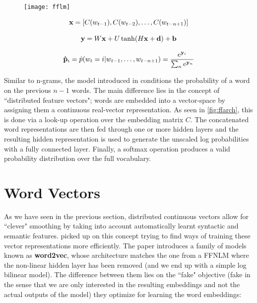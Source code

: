 \begin{figure}[H]
	\noindent\begin{minipage}{.4\linewidth}
		\centering
		\texttt{[image: fflm]}
		\label{fig:ffarch}
	\end{minipage}
	\hspace{0.25cm}
	\begin{minipage}{.7\linewidth}	
		\begin{equation} \label{eq:fwnlm}
		\openup 2ex
		\begin{gathered}
		\mathbf{x} = [C(w_{t-1}),C(w_{t-2}),\ldots,C(w_{t-n+1})] \\
		\mathbf{y} = W\mathbf{x} + U \tanh(H\mathbf{x}+\mathbf{d}) + \mathbf{b} \\
		\mathbf{\hat{p}}_i=\hat{p}(w_t=i|w_{t-1},\ldots,w_{t-n+1}) = \frac{e^{\mathbf{y}_i}}{\sum_{n}e^{\mathbf{y}_n}} \\
		\end{gathered}
		\end{equation}
	\end{minipage}
\end{figure}

Similar to n-grams, the model introduced in \cite{bengio2003neural} conditions the probability of a word on the previous $n-1$ words. The main difference lies in the concept of ``distributed feature vectors"; words are embedded into a vector-space by assigning them a continuous real-vector representation. As seen in \autoref{fig:ffarch}, this is done via a look-up operation over the embedding matrix $C$. The concatenated word representations are then fed through one or more hidden layers and the resulting hidden representation is used to generate the unscaled log probabilities with a fully connected layer. Finally, a softmax operation produces a valid probability distribution over the full vocabulary.

\section{Word Vectors}
\label{sec:wv}

As we have seen in the previous section, distributed continuous vectors allow for ``clever" smoothing by taking into account automatically learnt syntactic and semantic features. \cite{mikolov2013efficient} picked up on this concept trying to find ways of training these vector representations more efficiently. The paper introduces a family of models known as \textbf{word2vec}, whose architecture matches the one from a FFNLM where the non-linear hidden layer has been removed (and we end up with a simple log bilinear model). The difference between them lies on the ``fake" objective (fake in the sense that we are only interested in the resulting embeddings and not the actual outputs of the model) they optimize for learning the word embeddings:

